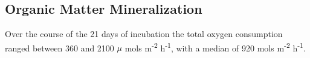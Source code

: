 \subsection{Organic Matter Mineralization}

Over the course of the 21 days of incubation the total oxygen consumption ranged between 360 and 2100 $\mu$ mols m\textsuperscript{-2} h\textsuperscript{-1}, with a median of 920 \mu mols m\textsuperscript{-2} h\textsuperscript{-1}.  